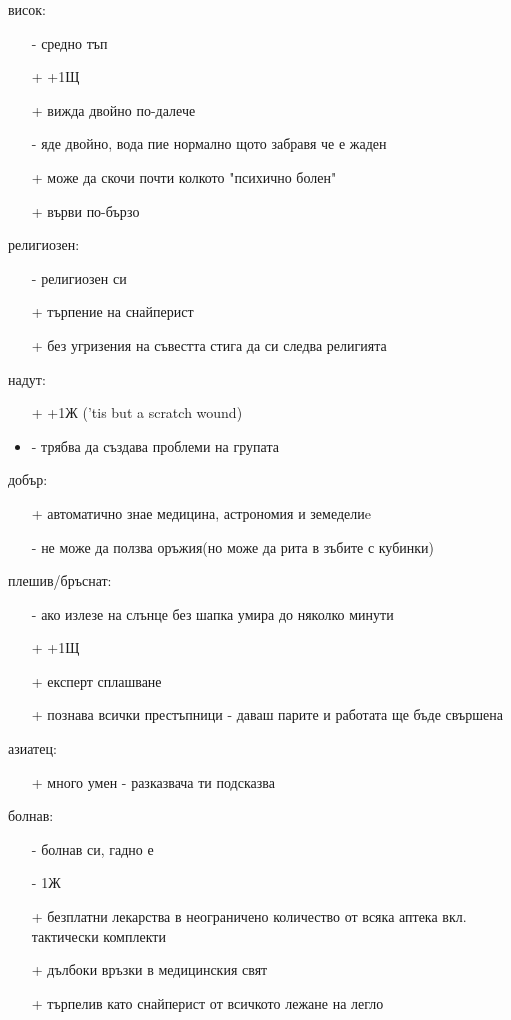 \documentclass{article}
\begin{document}
висок:
\begin{itemize}
\item[-] средно тъп
\item[+] +1Щ
\item[+] вижда двойно по-далече
\item[-] яде двойно, вода пие нормално щото забравя че е жаден
\item[+] може да скочи почти колкото "психично болен"
\item[+] върви по-бързо
\end{itemize}

религиозен:
\begin{itemize}
\item[-] религиозен си
\item[+] търпение на снайперист
\item[+] без угризения на съвестта стига да си следва религията
\end{itemize}

надут:
\begin{itemize}
\item[+] +1Ж ('tis but a scratch wound)
\item- трябва да създава проблеми на групата
\end{itemize}

добър:
\begin{itemize}
\item[+] автоматично знае медицина, астрономия и земеделиe
\item[-] не може да ползва оръжия(но може да рита в зъбите с кубинки)
\end{itemize}

плешив/бръснат:
\begin{itemize}
\item[-] ако излезе на слънце без шапка умира до няколко минути
\item[+] +1Щ
\item[+] експерт сплашване
\item[+] познава всички престъпници - даваш парите и работата ще бъде свършена
\end{itemize}

азиатец:
\begin{itemize}
\item[+] много умен - разказвача ти подсказва
\end{itemize}

болнав:
\begin{itemize}
\item[-] болнав си, гадно е
\item[-] 1Ж
\item[+] безплатни лекарства в неограничено количество от всяка аптека вкл. тактически комплекти
\item[+] дълбоки връзки в медицинския свят
\item[+] търпелив като снайперист от всичкото лежане на легло
\end{itemize}
\end{document}
